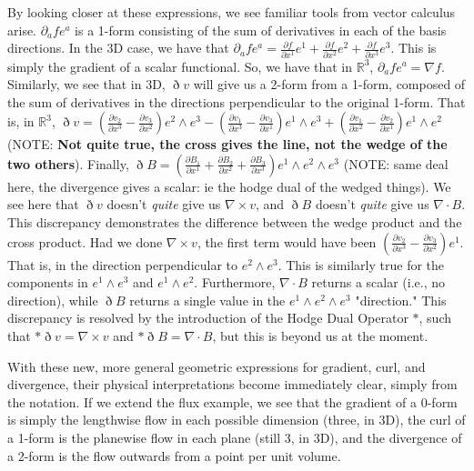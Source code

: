 \documentclass{book}
\begin{document}
By looking closer at these expressions, we see familiar tools from vector calculus arise. $\partial_a f e^a$ is a 1-form consisting of the sum of derivatives in each of the basis directions. In the 3D case, we have that $\partial_a f e^a = \frac{\partial f}{\partial x^1} e^1 + \frac{\partial f}{\partial x^2} e^2 + \frac{\partial f}{\partial x^3} e^3$. This is simply the gradient of a scalar functional. So, we have that in $\mathbb{R}^3$, $\partial_a f e^a = \nabla f$. Similarly, we see that in 3D, $\eth v$ will give us a 2-form from a 1-form, composed of the sum of derivatives in the directions perpendicular to the original 1-form. That is, in $\mathbb{R}^3$, $\eth v = (\frac{\partial v_2}{\partial x^3} - \frac{\partial v_3}{\partial x^2})e^2\wedge e^3 - (\frac{\partial v_1}{\partial x^3} - \frac{\partial v_3}{\partial x^1})e^1 \wedge e^3 + (\frac{\partial v_1}{\partial x^2} - \frac{\partial v_2}{\partial x^1})e^1 \wedge e^2$ (NOTE: \textbf{Not quite true, the cross gives the line, not the wedge of the two others}). Finally, $\eth B = (\frac{\partial B_1}{\partial x^1} + \frac{\partial B_2}{\partial x^2} + \frac{\partial B_3}{\partial x^3})e^1\wedge e^2 \wedge e^3$ (NOTE: same deal here, the divergence gives a scalar: ie the hodge dual of the wedged things). We see here that $\eth v$ doesn't \emph{quite} give us $\nabla \times v$, and $\eth B$ doesn't \emph{quite} give us $\nabla \cdot B$. This discrepancy demonstrates the difference between the wedge product and the cross product. Had we done $\nabla \times v$, the first term would have been $(\frac{\partial v_2}{\partial x^3} - \frac{\partial v_3}{\partial x^2})e^1$. That is, in the direction perpendicular to $e^2\wedge e^3$. This is similarly true for the components in $e^1\wedge e^3$ and $e^1 \wedge e^2$. Furthermore, $\nabla \cdot B$ returns a scalar (i.e., no direction), while $\eth B$ returns a single value in the $e^1 \wedge e^2 \wedge e^3$ "direction." This discrepancy is resolved by the introduction of the Hodge Dual Operator $*$, such that $*\eth v = \nabla \times v$ and $*\eth B = \nabla \cdot B$, but this is beyond us at the moment. 

With these new, more general geometric expressions for gradient, curl, and divergence, their physical interpretations become immediately clear, simply from the notation. If we extend the flux example, we see that the gradient of a 0-form is simply the lengthwise flow in each possible dimension (three, in 3D), the curl of a 1-form is the planewise flow in each plane (still 3, in 3D), and the divergence of a 2-form is the flow outwards from a point per unit volume. 
\end{document}
